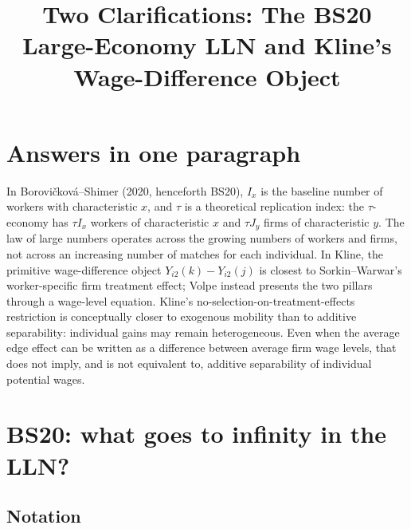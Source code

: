 \documentclass[11pt]{article}
\title{Two Clarifications: The BS20 Large-Economy LLN and Kline's
Wage-Difference Object}
\author{}
\date{}
\begin{document}
\maketitle

\section*{Answers in one paragraph}

In Borovi\v{c}kov\'a--Shimer (2020, henceforth BS20), \(I_x\) is the
baseline number of workers with characteristic \(x\), and \(\tau\) is a
theoretical replication index: the \(\tau\)-economy has \(\tau I_x\)
workers of characteristic \(x\) and \(\tau J_y\) firms of characteristic
\(y\).  The law of large numbers operates across the growing numbers of
workers and firms, not across an increasing number of matches for each
individual.  In Kline, the primitive wage-difference object
\(Y_{i2}(k)-Y_{i2}(j)\) is closest to Sorkin--Warwar's worker-specific firm
treatment effect; Volpe instead presents the two pillars through a wage-level
equation.  Kline's no-selection-on-treatment-effects restriction is
conceptually closer to exogenous mobility than to additive separability:
individual gains may remain heterogeneous.  Even when the average edge
effect can be written as a difference between average firm wage levels, that
does not imply, and is not equivalent to, additive separability of
individual potential wages.

\section{BS20: what goes to infinity in the LLN?}

\subsection{Notation}
\end{document}
